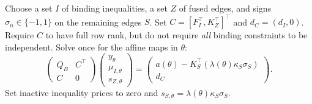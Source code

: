 Choose a set $I$ of binding inequalities, a set $Z$ of fused edges, and signs $\sigma_n\in\{-1,1\}$ on the remaining edges $S$. Set
$C=[F_I^\top,K_Z^\top]^\top$ and $d_C=(d_I,0)$. Require $C$ to have full row rank, but do not require \emph{all} binding constraints to be independent. Solve once for the affine maps in $\theta$:
\begin{equation}\label{eq:r13-cell-system}
 \begin{pmatrix}Q_B&C^\top\\ C&0\end{pmatrix}
 \begin{pmatrix}y_\theta\\ \mu_{I,\theta}\\s_{Z,\theta}\end{pmatrix}
 =\begin{pmatrix}a(\theta)-K_S^\top(\lambda(\theta)\kappa_S\sigma_S)\\d_C\end{pmatrix}.
\end{equation}
Set inactive inequality prices to zero and $s_{S,\theta}=\lambda(\theta)\kappa_S\sigma_S$.

